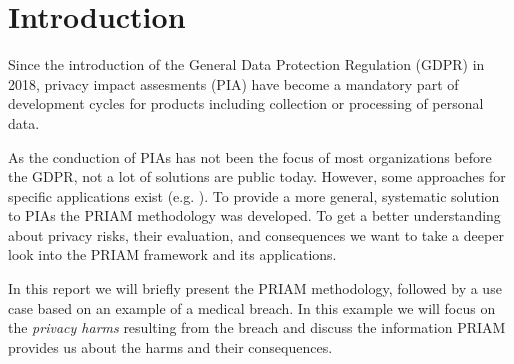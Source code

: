 \section{Introduction}
Since the introduction of the General Data Protection Regulation (GDPR) \cite{gdpr} in 2018, privacy impact assesments (PIA) have become a mandatory part of development cycles for products including collection or processing of personal data.

As the conduction of PIAs has not been the focus of most organizations before the GDPR, not a lot of solutions are public today. However, some approaches for specific applications exist (e.g. \cite{rfid}\cite{smart_grid}). To provide a more general, systematic solution to PIAs the PRIAM methodology \cite{de:hal-01302541} was developed. To get a better understanding about privacy risks, their evaluation, and consequences we want to take a deeper look into the PRIAM framework and its applications.

In this report we will briefly present the PRIAM methodology, followed by a use case based on an example of a medical breach. In this example we will focus on the \textit{privacy harms} resulting from the breach and discuss the information PRIAM provides us about the harms and their consequences.  